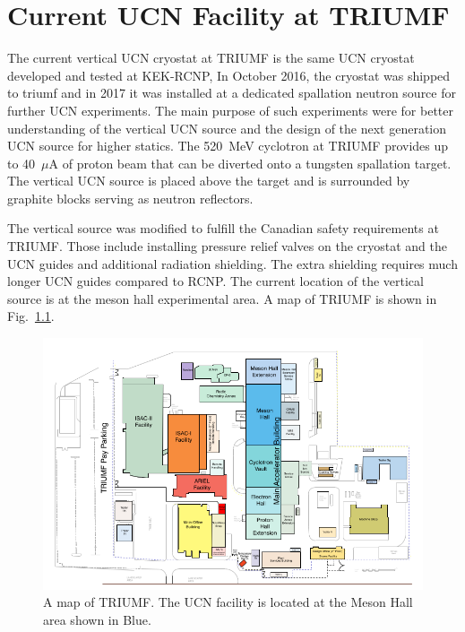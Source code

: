 \chapter{Current UCN Facility at TRIUMF\label{chap:UCNattriumf}}


The current vertical UCN cryostat at TRIUMF is the same UCN cryostat
developed and tested at KEK-RCNP, In October 2016, the cryostat was
shipped to triumf and in 2017 it was installed at a dedicated
spallation neutron source for further UCN experiments. The main
purpose of such experiments were for better understanding of the
vertical UCN source and the design of the next generation UCN source
for higher statics. The 520~MeV cyclotron at TRIUMF provides up to
40~$\mu$A of proton beam that can be diverted onto a tungsten
spallation target. The vertical UCN source is placed above the target
and is surrounded by graphite blocks serving as neutron reflectors.


The vertical source was modified to fulfill the Canadian safety
requirements at TRIUMF. Those include installing pressure relief
valves on the cryostat and the UCN guides and additional radiation
shielding. The extra shielding requires much longer UCN guides
compared to RCNP. The current location of the vertical source is at
the meson hall experimental area. A map of TRIUMF is shown in
Fig.~\ref{fig:sitemap}.

\begin{figure}[h!]
  \centering
  \includegraphics[width=1.0\textwidth]{sitemap.png}
  \caption{A map of TRIUMF. The UCN facility is located at the Meson
    Hall area shown in Blue.}
  \label{fig:sitemap}
\end{figure}

